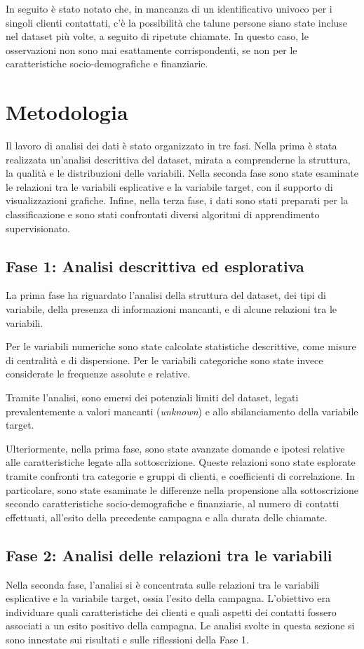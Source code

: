 \documentclass[11,5pt, a4paper]{article}
\begin{document}
In seguito è stato notato che, in mancanza di un identificativo univoco per i singoli clienti contattati, c'è la possibilità che talune persone siano state incluse nel dataset più volte, a seguito di ripetute chiamate. In questo caso, le osservazioni non sono mai esattamente corrispondenti, se non per le caratteristiche socio-demografiche e finanziarie.

\section{Metodologia}
Il lavoro di analisi dei dati è stato organizzato in tre fasi. Nella prima è stata realizzata un'analisi descrittiva del dataset, mirata a comprenderne la struttura, la qualità e le distribuzioni delle variabili. Nella seconda fase sono state esaminate le relazioni tra le variabili esplicative e la variabile target, con il supporto di visualizzazioni grafiche. Infine, nella terza fase, i dati sono stati preparati per la classificazione e sono stati confrontati diversi algoritmi di apprendimento supervisionato.

\subsection{Fase 1: Analisi descrittiva ed esplorativa}
\label{ss: Fase 1}
La prima fase ha riguardato l'analisi della struttura del dataset, dei tipi di variabile, della presenza di informazioni mancanti, e di alcune relazioni tra le variabili. 

Per le variabili numeriche sono state calcolate statistiche descrittive, come misure di centralità e di dispersione. Per le variabili categoriche sono state invece considerate le frequenze assolute e relative.

Tramite l'analisi, sono emersi dei potenziali limiti del dataset, legati prevalentemente a valori mancanti (\textit{unknown}) e allo sbilanciamento della variabile target.

Ulteriormente, nella prima fase, sono state avanzate domande e ipotesi relative alle caratteristiche legate alla sottoscrizione. Queste relazioni sono state esplorate tramite confronti tra categorie e gruppi di clienti, e coefficienti di correlazione. In particolare, sono state esaminate le differenze nella propensione alla sottoscrizione secondo caratteristiche socio-demografiche e finanziarie, al numero di contatti effettuati, all'esito della precedente campagna e alla durata delle chiamate.

\subsection{Fase 2: Analisi delle relazioni tra le variabili}
\label{ss:Fase2}
Nella seconda fase, l'analisi si è concentrata sulle relazioni tra le variabili esplicative e la variabile target, ossia l'esito della campagna. 
L'obiettivo era individuare quali caratteristiche dei clienti e quali aspetti dei contatti fossero associati a un esito positivo della campagna. Le analisi svolte in questa sezione si sono innestate sui risultati e sulle riflessioni della Fase 1.
\end{document}
